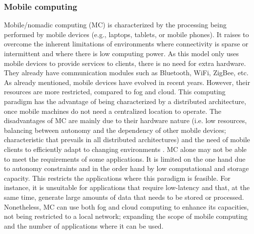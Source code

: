 \subsubsection{Mobile computing}\label{subsec:MC}
Mobile/nomadic computing (MC) is characterized by the processing being performed by mobile devices (e.g., laptops, tablets, or mobile phones). It raises to overcome the inherent limitations of environments where connectivity is sparse or intermittent and where there is low computing power. As this model only uses mobile devices to provide services to clients, there is no need for extra hardware. They already have communication modules such as Bluetooth, WiFi, ZigBee, etc. As already mentioned, mobile devices have evolved in recent years. However, their resources are more restricted, compared to fog and cloud. This computing paradigm has the advantage of being characterized by a distributed architecture, once mobile machines do not need a centralized location to operate. The disadvantages of MC are mainly due to their hardware nature (i.e. low resources, balancing between autonomy and the dependency of other mobile devices; characteristic that prevails in all distributed architectures) and the need of mobile clients to efficiently adapt to changing environments \cite{satyanarayanan1996fundamental}. MC alone may not be able to meet the requirements of some applications. It is limited on the one hand due to autonomy constraints and in the order hand by low computational and storage capacity. This restricts the applications where this paradigm is feasible. For instance, it is unsuitable for applications that require low-latency and that, at the same time, generate large amounts of data that needs to be stored or processed. Nonetheless, MC can use both fog and cloud computing to enhance its capacities, not being restricted to a local network; expanding the scope of mobile computing and the number of applications where it can be used.

